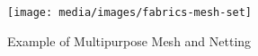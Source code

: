 \begin{figure}[H]
  \texttt{[image: media/images/fabrics-mesh-set]}
  \caption{Example of Multipurpose Mesh and Netting}
  \label{img:fabrics-3d-mesh-set}
\end{figure}
